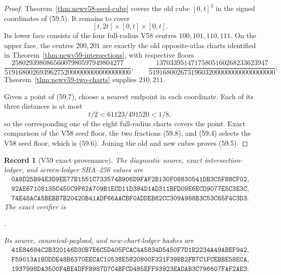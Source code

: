 \documentclass[11pt,oneside]{article}
\newtheorem{record}[theorem]{Record}
\theoremstyle{definition}
\theoremstyle{remark}
\begin{document}
\begin{proof}
Theorem~\ref{thm:newv58-seed-cube} covers the old cube
\([0,t]^3\) in the signed coordinates of (59.5).  It remains to
cover
\[
 [t,2t]\times[0,t]\times[0,t].                        \tag{59.7}
\]
Its lower face consists of the four full-radius V58 centres
\(100,101,110,111\).  On the upper face, the centres \(200,201\)
are exactly the old opposite-atlas charts identified in
Theorem~\ref{thm:newv59-intersections}, with respective floors
\[
\frac{25802939808656007980597949804277}
 {519168002693962752000000000000000000},
\qquad
\frac{13703395147175805160268233623947}
 {519168002673196032000000000000000000};              \tag{59.8}
\]
Theorem~\ref{thm:newv59-two-charts} supplies \(210,211\).

Given a point of (59.7), choose a nearest endpoint in each
coordinate.  Each of its three distances is at most
\[
 t/2<61123/491520<1/8,                                \tag{59.9}
\]
so the corresponding one of the eight full-radius charts covers
the point.  Exact comparison of the V58 seed floor, the two
fractions (59.8), and (59.4) selects the V58 seed floor, which is
(59.6).  Joining the old and new cubes proves (59.5).
\end{proof}

\begin{record}[V59 exact provenance]
\label{rec:newv59-provenance}
The diagnostic source, exact intersection-ledger, and screen-ledger
SHA--256 values are
\[
\begin{gathered}
\texttt{0A8D25B94E3D9EE77B1551C733574B906D9FAF2B130F08830541DB3C5F88CF02},\\
\texttt{92AE67108135C450C9F62A709B1ECD11D384D1AD311BFD09E6ECD9077E5C3E3C},\\
\texttt{74E48ACA5BEBB7B20420B41ADF66AACBF0ADDEB62CC309A988B3C53C65F4C3D3}.
\end{gathered}                                        \tag{59.10}
\]
The exact verifier is
\begin{center}
\footnotesize
{}.
\end{center}
Its source, canonical-payload, and new-chart-ledger hashes are
\[
\begin{gathered}
\texttt{41E84684C2B320146D30B7E6C5D405FCAC4A5834D5450F7D1B2234A49ABEF942},\\
\texttt{F59013A1B0DDE48B6370EECAC10538E5820800F321F39BB2FB7C1FCEBBE58ECA},\\
\texttt{1937998DA3500F4BE4DFF8987D7C4BFCD485EFF93923EADAB3C796607FAF2AE3}.
\end{gathered}                                        \tag{59.11}
\]
\end{record}
\end{document}
